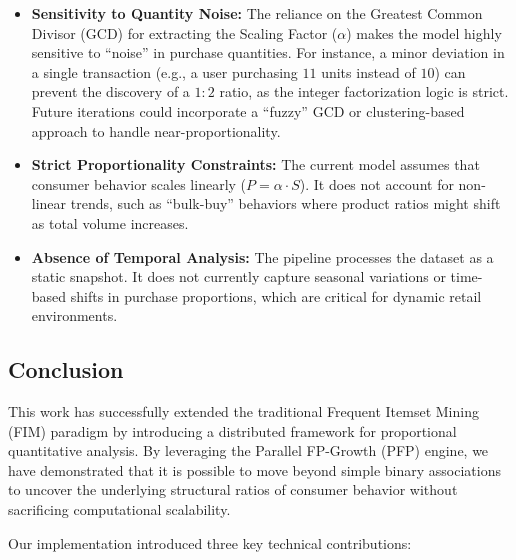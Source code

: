 \documentclass[10pt, twocolumn]{article}
\begin{document}
\begin{itemize}
    \item \textbf{Sensitivity to Quantity Noise:} The reliance on the Greatest
          Common Divisor (GCD) for extracting the Scaling Factor ($\alpha$) makes the
          model highly sensitive to ``noise'' in purchase quantities. For instance, a
          minor deviation in a single transaction (e.g., a user purchasing $11$ units
          instead of $10$) can prevent the discovery of a $1{:}2$ ratio, as the integer
          factorization logic is strict. Future iterations could incorporate a ``fuzzy''
          GCD or clustering-based approach to handle near-proportionality.

    \item \textbf{Strict Proportionality Constraints:} The current model
          assumes that consumer behavior scales linearly ($P = \alpha \cdot S$). It does
          not account for non-linear trends, such as ``bulk-buy'' behaviors where product
          ratios might shift as total volume increases.

    \item \textbf{Absence of Temporal Analysis:} The pipeline processes the
          dataset as a static snapshot. It does not currently capture seasonal variations
          or time-based shifts in purchase proportions, which are critical for dynamic
          retail environments.
\end{itemize}

\subsection{Conclusion}

This work has successfully extended the traditional Frequent Itemset Mining
(FIM) paradigm by introducing a distributed framework for proportional
quantitative analysis. By leveraging the Parallel FP-Growth (PFP) engine, we
have demonstrated that it is possible to move beyond simple binary associations
to uncover the underlying structural ratios of consumer behavior without
sacrificing computational scalability.

Our implementation introduced three key technical contributions:
\end{document}
